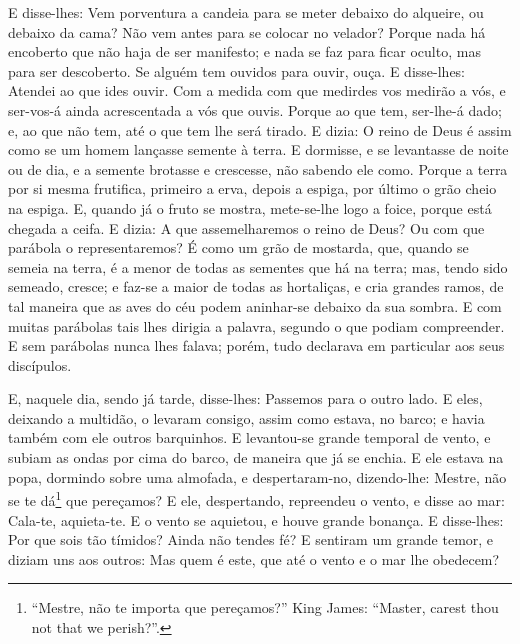 E disse-lhes: Vem porventura a candeia para se meter debaixo do
alqueire, ou debaixo da cama? Não vem antes para se colocar no
velador? Porque nada há encoberto que não haja de ser
manifesto; e nada se faz para ficar oculto, mas para ser descoberto.
Se alguém tem ouvidos para ouvir, ouça. E disse-lhes:
Atendei ao que ides ouvir. Com a medida com que medirdes vos medirão
a vós, e ser-vos-á ainda acrescentada a vós que ouvis. Porque
ao que tem, ser-lhe-á dado; e, ao que não tem, até o que tem lhe
será tirado. E dizia: O reino de Deus é assim como se um
homem lançasse semente à terra. E dormisse, e se levantasse
de noite ou de dia, e a semente brotasse e crescesse, não sabendo
ele como. Porque a terra por si mesma frutifica, primeiro a
erva, depois a espiga, por último o grão cheio na espiga. E,
quando já o fruto se mostra, mete-se-lhe logo a foice, porque está
chegada a ceifa. E dizia: A que assemelharemos o reino de
Deus? Ou com que parábola o representaremos? É como um grão
de mostarda, que, quando se semeia na terra, é a menor de todas as
sementes que há na terra; mas, tendo sido semeado, cresce; e
faz-se a maior de todas as hortaliças, e cria grandes ramos, de tal
maneira que as aves do céu podem aninhar-se debaixo da sua sombra.
E com muitas parábolas tais lhes dirigia a palavra, segundo o
que podiam compreender. E sem parábolas nunca lhes falava;
porém, tudo declarava em particular aos seus discípulos.

E, naquele dia, sendo já tarde, disse-lhes: Passemos para o outro
lado. E eles, deixando a multidão, o levaram consigo, assim
como estava, no barco; e havia também com ele outros barquinhos.
E levantou-se grande temporal de vento, e subiam as ondas por
cima do barco, de maneira que já se enchia. E ele estava na
popa, dormindo sobre uma almofada, e despertaram-no, dizendo-lhe:
Mestre, não se te dá\footnote{``Mestre, não te importa que
pereçamos?'' King James: ``Master, carest thou not that we
perish?''.} que pereçamos? E ele, despertando, repreendeu o
vento, e disse ao mar: Cala-te, aquieta-te. E o vento se aquietou, e
houve grande bonança. E disse-lhes: Por que sois tão tímidos?
Ainda não tendes fé? E sentiram um grande temor, e diziam uns
aos outros: Mas quem é este, que até o vento e o mar lhe obedecem?

\medskip

